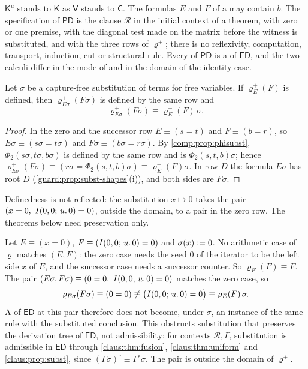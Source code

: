 $\mathsf{K}^{u}$ stands to $\mathsf{K}$ as $\mathsf{V}$ stands to
$\mathsf{C}$. The formulas $E$ and $F$ of a  may
contain $b$. The specification of $\mathsf{PD}$ is the clause
$\mathcal{R}$ in the initial context of a theorem,  with zero
or one premise,  with the diagonal test made on the matrix
before the witness is substituted, and  with the three
rows of $\varrho^{+}$; there is no reflexivity, computation, transport,
induction, cut or structural rule. Every  of
$\mathsf{PD}$ is a  of $\mathsf{ED}$, and the two
calculi differ in the mode of  and in the domain of the
identity case.

\begin{lemma}
\label{claus:lem:covar}
Let $\sigma$ be a capture-free substitution of terms for free variables.
If $\varrho^{+}_E(F)$ is defined, then $\varrho^{+}_{E\sigma}(F\sigma)$ is
defined by the same row and
\[
 \varrho^{+}_{E\sigma}(F\sigma)\equiv\varrho^{+}_E(F)\,\sigma .
\]
\end{lemma}
\begin{proof}
In the zero and the successor row $E\equiv(s=t)$ and $F\equiv(b=r)$, so
$E\sigma\equiv(s\sigma=t\sigma)$ and $F\sigma\equiv(b\sigma=r\sigma)$. By
\cref{comp:prop:phisubst}, $\Phi_2(s\sigma,t\sigma,b\sigma)$ is defined by
the same row and is $\Phi_2(s,t,b)\sigma$; hence
$\varrho^{+}_{E\sigma}(F\sigma)\equiv(r\sigma=\Phi_2(s,t,b)\sigma)
\equiv\varrho^{+}_E(F)\sigma$. In row $D$ the formula $E\sigma$ has root
$D$ (\cref{guard:prop:subst-shapes}(i)), and both sides are $F\sigma$.
\end{proof}

Definedness is not reflected: the substitution $x\mapsto 0$ takes the pair
$(x=0,\ \It{0}{0}{u}{0}=0)$, outside the domain, to a pair in the zero row.
The theorems below need preservation only.

\begin{remark}
\label{claus:rem:total}
Let $E\equiv(x=0)$, $F\equiv(I(0,0;\,u.\,0)=0)$ and $\sigma(x)\mathrel{:=} 0$.
No arithmetic case of $\varrho$ matches $(E,F)$: the zero case needs the
seed $0$ of the iterator to be the left side $x$ of $E$, and the successor
case needs a successor counter. So $\varrho_E(F)\equiv F$. The pair
$(E\sigma,F\sigma)\equiv(0=0,\ \It{0}{0}{u}{0}=0)$ matches the zero case,
so
\[
 \varrho_{E\sigma}(F\sigma)\equiv(0=0)\not\equiv
 \bigl(I(0,0;\,u.\,0)=0\bigr)\equiv\varrho_E(F)\,\sigma .
\]
A  of $\mathsf{ED}$ at this pair therefore does not
become, under $\sigma$, an instance of the same rule with the substituted
conclusion. This obstructs substitution that preserves the derivation tree
of $\mathsf{ED}$, not admissibility: for contexts $\mathcal{R},\Gamma$,
substitution is admissible in $\mathsf{ED}$ through
\cref{claus:thm:fusion}, \cref{claus:thm:uniform} and
\cref{claus:prop:subst}, since $(\Gamma\sigma)^{\circ}\equiv
\Gamma^{\circ}\sigma$. The pair is outside the domain of $\varrho^{+}$.
\end{remark}

